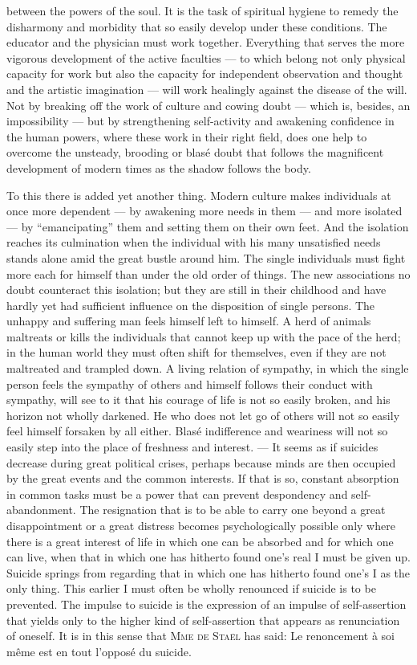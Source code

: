 \documentclass[12pt,a4paper,openany]{book}
\newcommand{\opage}[1]{\marginnote{\footnotesize\textit{[#1]}}}
\begin{document}
between the powers of the soul. It is the task of spiritual hygiene to remedy the disharmony and morbidity that
so easily develop under these conditions. The educator and the physician must work together. Everything that
serves the more vigorous development of the active faculties --- to which belong not only physical capacity for
work but also the capacity for independent observation and thought and the artistic imagination --- will work
healingly against the disease of the will. Not by breaking off the work of culture and cowing doubt --- which is,
besides, an impossibility --- but by strengthening self-activity and awakening confidence in the human powers,
where these work in their right field, does one help to overcome the unsteady, brooding or blasé doubt that
follows the magnificent development of modern times as the shadow follows the body.

To this there is added yet another thing. Modern culture makes individuals at once more dependent --- by
awakening more needs in them --- and more isolated --- by ``emancipating'' them and setting them on their own
feet. And the isolation reaches its culmination when the individual with his many unsatisfied needs stands alone
amid the great bustle around him. The single individuals must fight more each for himself than under the old
order of things. The new associations no doubt counteract this isolation; but they are still in their childhood
and have hardly yet had sufficient influence on the disposition of single persons. The unhappy and suffering man
feels himself left to himself. A herd of animals maltreats or kills
\opage{213}the individuals that cannot keep up with the pace of the herd; in the human world they must often shift for
themselves, even if they are not maltreated and trampled down. A living relation of sympathy, in which the single
person feels the sympathy of others and himself follows their conduct with sympathy, will see to it that his
courage of life is not so easily broken, and his horizon not wholly darkened. He who does not let go of others
will not so easily feel himself forsaken by all either. Blasé indifference and weariness will not so easily step
into the place of freshness and interest. --- It seems as if suicides decrease during great political crises,
perhaps because minds are then occupied by the great events and the common interests. If that is so, constant
absorption in common tasks must be a power that can prevent despondency and self-abandonment. The resignation that
is to be able to carry one beyond a great disappointment or a great distress becomes psychologically possible only
where there is a great interest of life in which one can be absorbed and for which one can live, when that in
which one has hitherto found one's real I must be given up. Suicide springs from regarding that in which one has
hitherto found one's I as the only thing. This earlier I must often be wholly renounced if suicide is to be
prevented. The impulse to suicide is the expression of an impulse of self-assertion that yields only to the
higher kind of self-assertion that appears as renunciation of oneself. It is in this sense that \textsc{Mme de Staël} has said: Le renoncement à soi même est en tout l'opposé du suicide.
\end{document}
